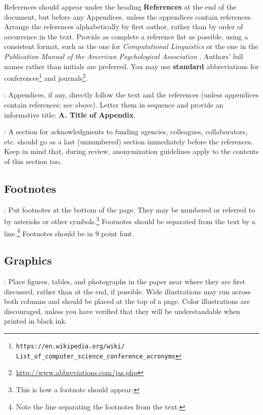 \documentclass[11pt,letterpaper]{article}
\newcommand\BibTeX{B{\sc ib}\TeX}
\begin{document}
References should appear under the heading {\bf References} at the end of
the document, but before any Appendices, unless the appendices contain
references. Arrange the references alphabetically by first author, rather
than by order of occurrence in the text.
Provide as complete a reference list as possible, using a consistent format,
such as the one for {\em Computational Linguistics\/} or the one in the 
{\em Publication Manual of the American Psychological Association\/}
\cite{APA:83}. Authors' full names rather than initials are preferred. You
may use {\bf standard} abbreviations for conferences\footnote{\scriptsize {\tt https://en.wikipedia.org/wiki/ \\ \-\hspace{.75cm} List\_of\_computer\_science\_conference\_acronyms}}
and journals\footnote{\url{http://www.abbreviations.com/jas.php}}.

: Appendices, if any, directly follow the text and
the references (unless appendices contain references; see above). Letter
them in sequence and provide an informative title: {\bf A. Title of Appendix}.

: A section for acknowledgments to funding
agencies, colleagues, collaborators, etc. should go as a last (unnumbered)
section immediately before the references. Keep in mind that, during review,
anonymization guidelines apply to the contents of this section too.

\subsection{Footnotes}

: Put footnotes at the bottom of the page. They may be
numbered or referred to by asterisks or other symbols.\footnote{This is
how a footnote should appear.} Footnotes should be separated from the text
by a line.\footnote{Note the line separating the footnotes from the text.}
Footnotes should be in 9 point font.

\subsection{Graphics}

: Place figures, tables, and photographs in the
paper near where they are first discussed, rather than at the end, if possible.
Wide illustrations may run across both columns and should be placed at the
top of a page. Color illustrations are discouraged, unless you have verified
that they will be understandable when printed in black ink. 
\end{document}
